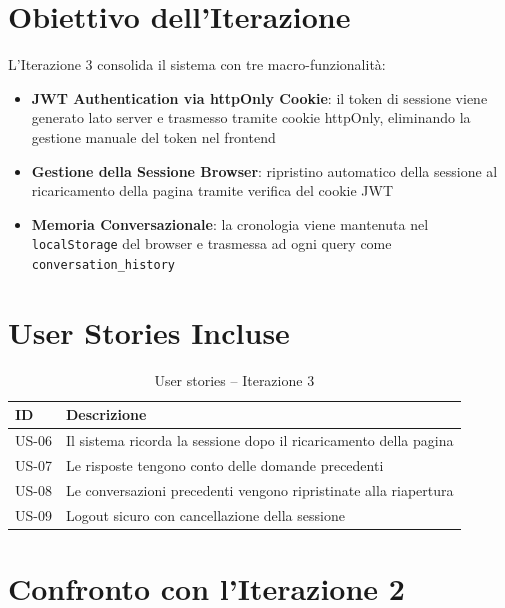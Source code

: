 \documentclass[a4paper,12pt]{report}
\begin{document}
\section{Obiettivo dell'Iterazione}

L'Iterazione 3 consolida il sistema con tre macro-funzionalità:
\begin{itemize}
    \item \textbf{JWT Authentication via httpOnly Cookie}: il token di sessione viene generato lato server e trasmesso tramite cookie httpOnly, eliminando la gestione manuale del token nel frontend
    \item \textbf{Gestione della Sessione Browser}: ripristino automatico della sessione al ricaricamento della pagina tramite verifica del cookie JWT
    \item \textbf{Memoria Conversazionale}: la cronologia viene mantenuta nel \texttt{localStorage} del browser e trasmessa ad ogni query come \texttt{conversation\_history}
\end{itemize}

\section{User Stories Incluse}

\begin{table}[H]
\centering
\begin{tabularx}{\textwidth}{l X}
\toprule
\textbf{ID} & \textbf{Descrizione} \\
\midrule
US-06 & Il sistema ricorda la sessione dopo il ricaricamento della pagina \\
US-07 & Le risposte tengono conto delle domande precedenti \\
US-08 & Le conversazioni precedenti vengono ripristinate alla riapertura \\
US-09 & Logout sicuro con cancellazione della sessione \\
\bottomrule
\end{tabularx}
\caption{User stories -- Iterazione 3}
\end{table}

\section{Confronto con l'Iterazione 2}
\end{document}
